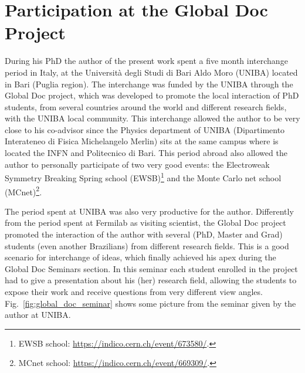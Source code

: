 \chapter{Participation at the Global Doc Project}
During his PhD the author of the present work spent a five month interchange period in Italy, at the Università degli Studi di Bari Aldo Moro (UNIBA) located in Bari (Puglia region). The interchange was funded by the UNIBA through the Global Doc project, which was developed to promote the local interaction of PhD students, from several countries around the world and different research fields, with the UNIBA local community. This interchange allowed the author to be very close to his co-advisor since the Physics department of UNIBA (Dipartimento Interateneo di Fisica Michelangelo Merlin) sits at the same campus where is located the INFN and Politecnico di Bari. This period abroad also allowed the author to personally participate of two very good events: the Electroweak Symmetry Breaking Spring school (EWSB)\footnote{EWSB school: \url{https://indico.cern.ch/event/673580/}.} and the Monte Carlo net school (MCnet)\footnote{MCnet school: \url{https://indico.cern.ch/event/669309/}.}.

The period spent at UNIBA was also very productive for the author. Differently from the period spent at Fermilab as visiting scientist, the Global Doc project promoted the interaction of the author with several (PhD, Master and Grad) students (even another Brazilians) from different research fields. This is a good scenario for interchange of ideas, which finally achieved his apex during the Global Doc Seminars section. In this seminar each student enrolled in the project had to give a presentation about his (her) research field, allowing the students to expose their work and receive questions from very different view angles. Fig.~\ref{fig:global_doc_seminar} shows some picture from the seminar given by the author at UNIBA.

